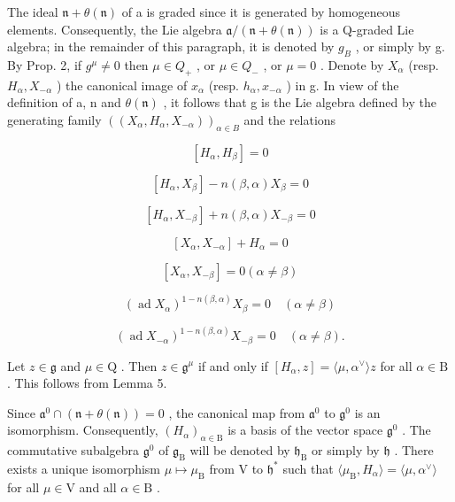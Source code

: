 The ideal \(\mathfrak{n} + \theta(\mathfrak{n})\) of a is graded since it is generated by homogeneous elements. Consequently, the Lie algebra \(\mathfrak{a}/(\mathfrak{n}+\theta(\mathfrak{n}))\) is a Q-graded Lie algebra; in the remainder of this paragraph, it is denoted by \(g_{B}\) , or simply by g. By Prop. 2, if \(g^{\mu} \neq 0\) then \(\mu \in Q_{+}\) , or \(\mu \in Q_{-}\) , or \(\mu = 0\) . Denote by \(X_{\alpha}\) (resp. \(H_{\alpha}, X_{-\alpha}\) ) the canonical image of \(x_{\alpha}\) (resp. \(h_{\alpha}, x_{-\alpha}\) ) in g. In view of the definition of a, n and \(\theta(\mathfrak{n})\) , it follows that g is the Lie algebra defined by the generating family \(((X_{\alpha}, H_{\alpha}, X_{-\alpha}))_{\alpha \in B}\) and the relations

\[
[ H _ {\alpha}, H _ {\beta} ] = 0\tag{16}
\]

\[
[ H _ {\alpha}, X _ {\beta} ] - n (\beta , \alpha) X _ {\beta} = 0\tag{17}
\]

\[
[ H _ {\alpha}, X _ {- \beta} ] + n (\beta , \alpha) X _ {- \beta} = 0\tag{18}
\]

\[
[ X _ {\alpha}, X _ {- \alpha} ] + H _ {\alpha} = 0\tag{19}
\]

\[
[ X _ {\alpha}, X _ {- \beta} ] = 0 (\alpha \neq \beta)\tag{20}
\]

\[
(\operatorname{ad} X _ {\alpha}) ^ {1 - n (\beta , \alpha)} X _ {\beta} = 0 \quad (\alpha \neq \beta)\tag{21}
\]

\[
(\operatorname{ad} X _ {- \alpha}) ^ {1 - n (\beta , \alpha)} X _ {- \beta} = 0 \quad (\alpha \neq \beta).\tag{22}
\]

Let \(z \in \mathfrak{g}\) and \(\mu \in \mathrm{Q}\) . Then \(z \in \mathfrak{g}^{\mu}\) if and only if \([H_{\alpha}, z] = \langle \mu, \alpha^{\vee} \rangle z\) for all \(\alpha \in \mathrm{B}\) . This follows from Lemma 5.

Since \(\mathfrak{a}^0\cap (\mathfrak{n} + \theta (\mathfrak{n})) = 0\) , the canonical map from \(\mathfrak{a}^0\) to \(\mathfrak{g}^0\) is an isomorphism. Consequently, \((H_{\alpha})_{\alpha \in \mathrm{B}}\) is a basis of the vector space \(\mathfrak{g}^0\) . The commutative subalgebra \(\mathfrak{g}^0\) of \(\mathfrak{g}_{\mathrm{B}}\) will be denoted by \(\mathfrak{h}_{\mathrm{B}}\) or simply by \(\mathfrak{h}\) . There exists a unique isomorphism \(\mu \mapsto \mu_{\mathrm{B}}\) from V to \(\mathfrak{h}^*\) such that \(\langle \mu_{\mathrm{B}},H_{\alpha}\rangle = \langle \mu ,\alpha^{\vee}\rangle\) for all \(\mu \in \mathrm{V}\) and all \(\alpha \in \mathrm{B}\) .

